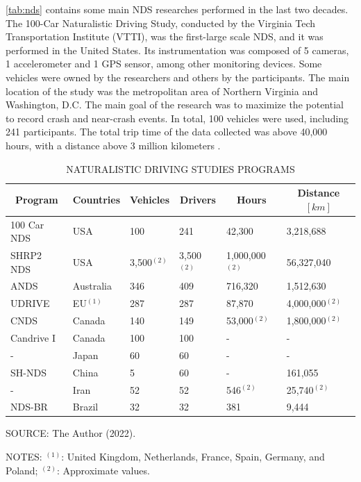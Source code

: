 \autoref{tab:nds} contains some main NDS researches performed in the last two decades. The 100-Car Naturalistic Driving Study, conducted by the Virginia Tech Transportation Institute (VTTI), was the first-large scale NDS, and it was performed in the United States. Its instrumentation was composed of 5 cameras, 1 accelerometer and 1 GPS sensor, among other monitoring devices. Some vehicles were owned by the researchers and others by the participants. The main location of the study was the metropolitan area of Northern Virginia and Washington, D.C. The main goal of the research was to maximize the potential to record crash and near-crash events. In total, 100 vehicles were used, including 241 participants. The total trip time of the data collected was above 40,000 hours, with a distance above 3 million kilometers \cite{Neale2005}.

\begin{table}[!hbtp]
    \footnotesize
    \captionsetup{justification=raggedright,
        singlelinecheck=false,
        font=footnotesize}
    \caption{NATURALISTIC DRIVING STUDIES PROGRAMS}
    \centering
    \begin{tabular}{llllll}
        \hline
        \multicolumn{1}{c}{\textbf{Program}} & \multicolumn{1}{c}{\textbf{Countries}} & \multicolumn{1}{c}{\textbf{Vehicles}} & \multicolumn{1}{c}{\textbf{Drivers}} & \multicolumn{1}{c}{\textbf{Hours}} & \multicolumn{1}{c}{\textbf{Distance} $[km]$} \\
        \hline
        100 Car NDS & USA        & 100 & 241 & 42,300 & 3,218,688 \\
        SHRP2 NDS   & USA        & 3,500$^{(2)}$ & 3,500$^{(2)}$ & 1,000,000$^{(2)}$ & 56,327,040 \\
        ANDS        & Australia  & 346 & 409 & 716,320 & 1,512,630 \\
        UDRIVE      & EU$^{(1)}$ & 287 & 287 & 87,870 & 4,000,000$^{(2)}$ \\
        CNDS        & Canada     & 140 & 149 & 53,000$^{(2)}$ & 1,800,000$^{(2)}$ \\
        Candrive I  & Canada     & 100 & 100 & - & - \\
        -           & Japan      & 60  & 60  & - & - \\
        SH-NDS      & China      & 5   & 60  & - & 161,055 \\
        -           & Iran       & 52  & 52  & 546$^{(2)}$ & 25,740$^{(2)}$ \\
        NDS-BR      & Brazil     & 32  & 32  & 381 & 9,444 \\ 
        \hline
    \end{tabular}
    \label{tab:nds}
    \par \vspace{2mm} \footnotesize \raggedright
    SOURCE: The Author (2022).
    \par \vspace{1mm} \footnotesize \raggedright
    NOTES: $^{(1)}$: United Kingdom, Netherlands, France, Spain, Germany, and Poland; $^{(2)}$: Approximate values.
\end{table}

